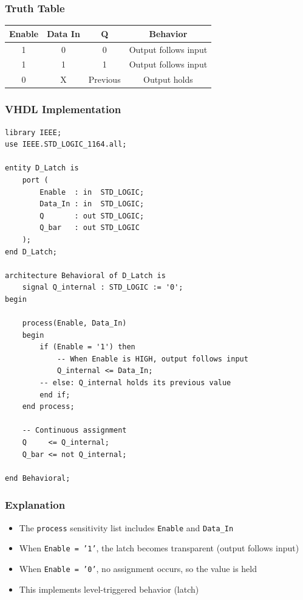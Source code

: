 \documentclass[12pt,a4paper]{article}
\begin{document}
\subsubsection{Truth Table}
\begin{table}[h]
\centering
\begin{tabular}{|c|c|c|c|}
\hline
\textbf{Enable} & \textbf{Data In} & \textbf{Q} & \textbf{Behavior} \\
\hline
1 & 0 & 0 & Output follows input \\
\hline
1 & 1 & 1 & Output follows input \\
\hline
0 & X & Previous & Output holds \\
\hline
\end{tabular}
\end{table}

\subsubsection{VHDL Implementation}

\begin{lstlisting}
library IEEE;
use IEEE.STD_LOGIC_1164.all;

entity D_Latch is
    port (
        Enable  : in  STD_LOGIC;
        Data_In : in  STD_LOGIC;
        Q       : out STD_LOGIC;
        Q_bar   : out STD_LOGIC
    );
end D_Latch;

architecture Behavioral of D_Latch is
    signal Q_internal : STD_LOGIC := '0';
begin
    
    process(Enable, Data_In)
    begin
        if (Enable = '1') then
            -- When Enable is HIGH, output follows input
            Q_internal <= Data_In;
        -- else: Q_internal holds its previous value
        end if;
    end process;
    
    -- Continuous assignment
    Q     <= Q_internal;
    Q_bar <= not Q_internal;
    
end Behavioral;
\end{lstlisting}

\subsubsection{Explanation}
\begin{itemize}
    \item The \texttt{process} sensitivity list includes \texttt{Enable} and \texttt{Data\_In}
    \item When \texttt{Enable = '1'}, the latch becomes transparent (output follows input)
    \item When \texttt{Enable = '0'}, no assignment occurs, so the value is held
    \item This implements level-triggered behavior (latch)
\end{itemize}
\end{document}

